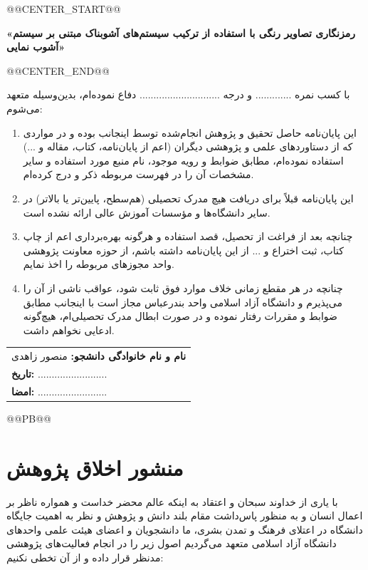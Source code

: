 @@CENTER_START@@


\textbf{«رمزنگاری تصاویر رنگی با استفاده از ترکیب سیستم‌های آشوبناک مبتنی بر سیستم آشوب نمایی»}


@@CENTER_END@@


با کسب نمره ............. و درجه ............................. دفاع نموده‌ام، بدین‌وسیله متعهد می‌شوم:

\begin{enumerate}
    \item این پایان‌نامه حاصل تحقیق و پژوهش انجام‌شده توسط اینجانب بوده و در مواردی که از دستاوردهای علمی و پژوهشی دیگران (اعم از پایان‌نامه، کتاب، مقاله و ...) استفاده نموده‌ام، مطابق ضوابط و رویه موجود، نام منبع مورد استفاده و سایر مشخصات آن را در فهرست مربوطه ذکر و درج کرده‌ام.
    \item این پایان‌نامه قبلاً برای دریافت هیچ مدرک تحصیلی (هم‌سطح، پایین‌تر یا بالاتر) در سایر دانشگاه‌ها و مؤسسات آموزش عالی ارائه نشده است.
    \item چنانچه بعد از فراغت از تحصیل، قصد استفاده و هرگونه بهره‌برداری اعم از چاپ کتاب، ثبت اختراع و ... از این پایان‌نامه داشته باشم، از حوزه معاونت پژوهشی واحد مجوزهای مربوطه را اخذ نمایم.
    \item چنانچه در هر مقطع زمانی خلاف موارد فوق ثابت شود، عواقب ناشی از آن را می‌پذیرم و دانشگاه آزاد اسلامی واحد بندرعباس مجاز است با اینجانب مطابق ضوابط و مقررات رفتار نموده و در صورت ابطال مدرک تحصیلی‌ام، هیچ‌گونه ادعایی نخواهم داشت.
\end{enumerate}

\vspace{1cm}

\begin{flushleft}
\begin{tabular}{l}
\textbf{نام و نام خانوادگی دانشجو:} منصور زاهدی \\
\textbf{تاریخ:} ......................... \\
\textbf{امضا:} ......................... \\
\end{tabular}
\end{flushleft}



@@PB@@

   
\chapter*{منشور اخلاق پژوهش}

با یاری از خداوند سبحان و اعتقاد به اینکه عالم محضر خداست و همواره ناظر بر اعمال انسان و به منظور پاس‌داشت مقام بلند دانش و پژوهش و نظر به اهمیت جایگاه دانشگاه در اعتلای فرهنگ و تمدن بشری، ما دانشجویان و اعضای هیئت علمی واحدهای دانشگاه آزاد اسلامی متعهد می‌گردیم اصول زیر را در انجام فعالیت‌های پژوهشی مدنظر قرار داده و از آن تخطی نکنیم:


